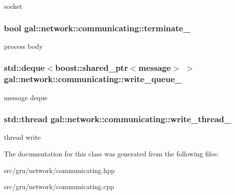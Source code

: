 socket \hypertarget{classgal_1_1network_1_1communicating_a4dc031687aa84ce7e3cca5ce9839d5d7}{
\subsubsection[{terminate\-\_\-}]{\setlength{\rightskip}{0pt plus 5cm}bool {\bf gal\-::network\-::communicating\-::terminate\-\_\-}}}\label{classgal_1_1network_1_1communicating_a4dc031687aa84ce7e3cca5ce9839d5d7}
process body \hypertarget{classgal_1_1network_1_1communicating_a5d0757e59bab953f76f65edfc1b3bd15}{
\subsubsection[{write\-\_\-queue\-\_\-}]{\setlength{\rightskip}{0pt plus 5cm}std\-::deque$<$boost\-::shared\-\_\-ptr$<${\bf message}$>$ $>$ {\bf gal\-::network\-::communicating\-::write\-\_\-queue\-\_\-}}}\label{classgal_1_1network_1_1communicating_a5d0757e59bab953f76f65edfc1b3bd15}
message deque \hypertarget{classgal_1_1network_1_1communicating_afc83d88ea30befb842e16a5cf7d5e936}{
\subsubsection[{write\-\_\-thread\-\_\-}]{\setlength{\rightskip}{0pt plus 5cm}std\-::thread {\bf gal\-::network\-::communicating\-::write\-\_\-thread\-\_\-}}}\label{classgal_1_1network_1_1communicating_afc83d88ea30befb842e16a5cf7d5e936}
thread write 

\-The documentation for this class was generated from the following files\-:\begin{DoxyCompactItemize}
\item 
src/gru/network/communicating.\-hpp\item 
src/gru/network/communicating.\-cpp\end{DoxyCompactItemize}
